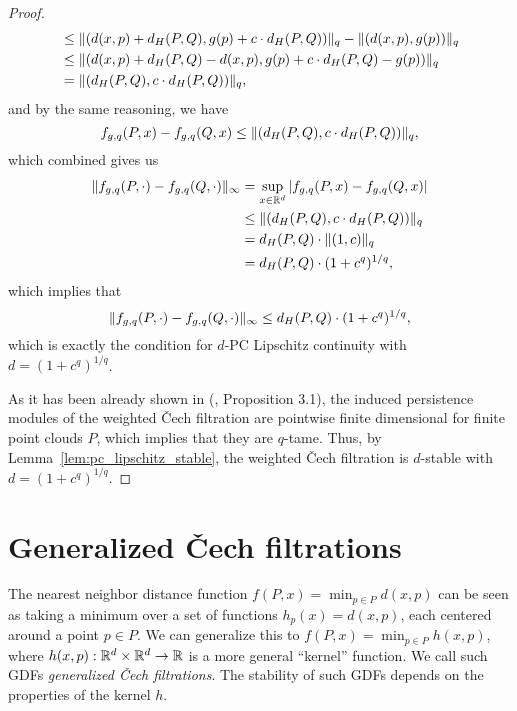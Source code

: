 \begin{proof}
\begin{align}
        & \leq \lVert(d(x, p) + d_H(P, Q), g(p) + c \cdot d_H(P, Q))\rVert_q - \lVert(d(x, p), g(p))\rVert_q \\
        & \leq \lVert(d(x, p) + d_H(P, Q) - d(x, p), g(p) + c \cdot d_H(P, Q) - g(p))\rVert_q \\
        & = \lVert(d_H(P, Q), c \cdot d_H(P, Q))\rVert_q,
    \end{align}
    and by the same reasoning, we have
    \begin{equation}
        f_{g, q}(P, x) - f_{g, q}(Q, x) \leq \lVert(d_H(P, Q), c \cdot d_H(P, Q))\rVert_q,
    \end{equation}
    which combined gives us
    \begin{align}
        \lVert f_{g, q}(P, \cdot) - f_{g, q}(Q, \cdot)\rVert_\infty
        & = \sup_{x \in \mathbb{R}^d} |f_{g, q}(P, x) - f_{g, q}(Q, x)| \\
        & \leq \lVert(d_H(P, Q), c \cdot d_H(P, Q))\rVert_q \\
        & = d_H(P, Q) \cdot \lVert(1, c)\rVert_q \\
        & = d_H(P, Q) \cdot (1 + c^q)^{1/q},
    \end{align}
    which implies that
    \begin{equation}
        \lVert f_{g, q}(P, \cdot) - f_{g, q}(Q, \cdot)\rVert_\infty \leq d_H(P, Q) \cdot (1 + c^q)^{1/q},
    \end{equation}
    which is exactly the condition for $d$-PC Lipschitz continuity with $d = (1 + c^q)^{1/q}$.

    As it has been already shown in (\cite{anai2020dtm}, Proposition 3.1),
    the induced persistence modules of the weighted \v{C}ech filtration are
    pointwise finite dimensional for finite point clouds $P$, which implies
    that they are $q$-tame. Thus, by Lemma~\ref{lem:pc_lipschitz_stable}, the
    weighted \v{C}ech filtration is $d$-stable with $d = (1 + c^q)^{1/q}$.
\end{proof}

\section{Generalized \v{C}ech filtrations}

The nearest neighbor distance function $f(P, x) = \min_{p \in P} d(x, p)$ can be
seen as taking a minimum over a set of functions $h_p(x) = d(x, p)$, each
centered around a point $p \in P$. We can generalize this to
$f(P, x) = \min_{p \in P} h(x, p)$, where $h(x, p) : \mathbb{R}^d \times \mathbb{R}^d \to \mathbb{R}$ is
a more general ``kernel'' function. We call such GDFs \emph{generalized \v{C}ech
filtrations}. The stability of such GDFs depends on the properties of the kernel
$h$.

